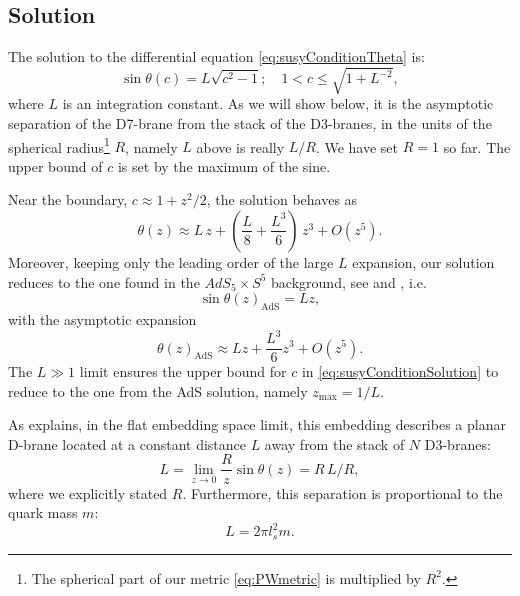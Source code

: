 \subsection{Solution}\label{sec:solution}

The solution to the differential equation \eqref{eq:susyConditionTheta} is:
\begin{equation}\label{eq:susyConditionSolution}
\boxed{\sin\theta(c) = L \sqrt{c^2-1}; \quad 1 < c \leq \sqrt{1+L^{-2}}},
\end{equation}
where $L$ is an integration constant. As we will show below, it is the asymptotic separation of the D7-brane from the stack of the D3-branes, in the units of the spherical radius\footnote{The spherical part of our metric \eqref{eq:PWmetric} is multiplied by $R^2$.} $R$, namely $L$ above is really $ L/R$.
We have set $R=1$ so far. The upper bound of $c$ is set by the maximum of the sine.


Near the boundary, $c \approx 1 + z^2/2$, the solution behaves as
\begin{equation} \label{eq:thetaExpanded}
 \theta(z) \approx L \, z + \left(\frac{L}{8} +\frac{L^3}{6} \right) \, z^3 + O(z^5).
\end{equation} 
Moreover, keeping only the leading order of the large $L$ expansion, our solution reduces to the one found in the $AdS_5 \times S^5$ background, see \cite{Karch:2002sh} and \cite{Karch:2005ms}, i.e.
\begin{equation}
 \sin\theta(z)_\text{AdS} = L z,
\end{equation}
with the asymptotic expansion
\begin{equation}
\theta(z)_\text{AdS} \approx L z + \frac{L^3}{6} z^3 + O(z^5).
\end{equation}
The $L\gg 1$ limit ensures the upper bound for $c$ in \eqref{eq:susyConditionSolution} to reduce to the one from the AdS solution, namely $z_\text{max}=1/L$. 


As \cite{Karch:2005ms} explains, in the flat embedding space limit, this embedding describes a planar D-brane located at a constant distance $L$ away from the stack of $N$ D3-branes:
\begin{equation}
 L = \lim_{z \rightarrow 0 } \frac{R}{z} \sin\theta(z) = R \, L/R,
\end{equation}
where we explicitly stated $R$. Furthermore, this separation is proportional to the quark mass $m$:
\begin{equation}
 L = 2 \pi l_s^2 m.
\end{equation}


